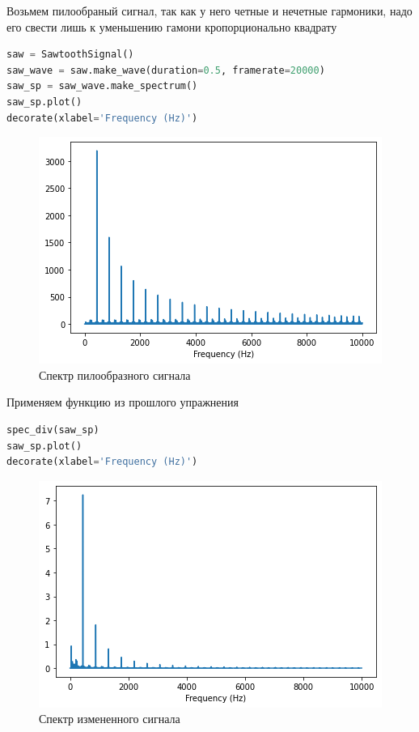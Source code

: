Возьмем пилообраный сигнал, так как у него четные и нечетные гармоники, надо его свести лишь к уменьшению гамони кропорционально квадрату

\begin{lstlisting}[language=Python]
saw = SawtoothSignal()
saw_wave = saw.make_wave(duration=0.5, framerate=20000)
saw_sp = saw_wave.make_spectrum()
saw_sp.plot()
decorate(xlabel='Frequency (Hz)')
\end{lstlisting}

\begin{figure}[H]
	\begin{center}
		\includegraphics[scale=1]{fig/lab02/lab02_12.png}
		\caption{Спектр пилообразного сигнала}
	\end{center}
\end{figure}

Применяем функцию из прошлого упражнения

\begin{lstlisting}[language=Python]
spec_div(saw_sp)
saw_sp.plot()
decorate(xlabel='Frequency (Hz)')
\end{lstlisting}

\begin{figure}[H]
	\begin{center}
		\includegraphics[scale=1]{fig/lab02/lab02_13.png}
		\caption{Спектр измененного сигнала}
	\end{center}
\end{figure}


